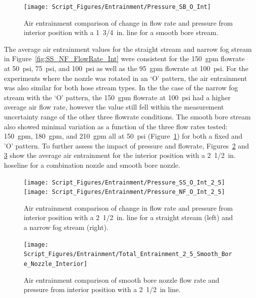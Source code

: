 \documentclass[12pt,oneside]{book}
\begin{document}
\begin{figure}[!ht]
\centering
\texttt{[image: Script\_Figures/Entrainment/Pressure\_SB\_O\_Int]}
\caption[Air Entrainment Comparison of Pressure and Flow Rate for Interior Smooth Bore Nozzle from 1~3/4~in. Line]{Air entrainment comparison of change in flow rate and pressure from interior position with a 1~3/4~in. line for a smooth bore stream.}
\label{fig:SB_Flowrate_Int}
\end{figure}

The average air entrainment values for the straight stream and narrow fog stream in Figure~\ref{fig:SS_NF_FlowRate_Int} were consistent for the 150~gpm flowrate at 50~psi, 75~psi, and 100~psi as well as the 95~gpm flowrate at 100~psi. For the experiments where the nozzle was rotated in an `O' pattern, the air entrainment was also similar for both hose stream types. In the the case of the narrow fog stream with the `O' pattern, the 150~gpm flowrate at 100~psi had a higher average air flow rate, however the value still fell within the measurement uncertainty range of the other three flowrate conditions. The smooth bore stream also showed minimal variation as a function of the three flow rates tested: 150~gpm, 180~gpm, and 210~gpm all at 50~psi (Figure~\ref{fig:SB_Flowrate_Int}) for both a fixed and 'O' pattern. To further assess the impact of pressure and flowrate, Figures~\ref{fig:SS_NF_FlowRate_Int_2_5} and \ref{fig:SB_Flowrate_Int_2_5} show the average air entrainment for the interior position with a 2~1/2~in. hoseline for a combination nozzle and smooth bore nozzle.

\begin{figure}[!ht]
\centering
\texttt{[image: Script\_Figures/Entrainment/Pressure\_SS\_O\_Int\_2\_5]}
\texttt{[image: Script\_Figures/Entrainment/Pressure\_NF\_O\_Int\_2\_5]}
\caption[Air Entrainment Comparison of Pressure and Flow Rate for Interior Combination Nozzle from 2~1/2~in. Line]{Air entrainment comparison of change in flow rate and pressure from interior position with a 2~1/2~in. line for a straight stream (left) and a narrow fog stream (right).}
\label{fig:SS_NF_FlowRate_Int_2_5}
\end{figure}

\begin{figure}[!ht]
\centering
\texttt{[image: Script\_Figures/Entrainment/Total\_Entrainment\_2\_5\_Smooth\_Bore\_Nozzle\_Interior]}
\caption[Air Entrainment Comparison of Exterior Smooth Bore Nozzle from 2~1/2~in. Line]{Air entrainment comparison of smooth bore nozzle flow rate and pressure from interior position with a 2~1/2~in line.}
\label{fig:SB_Flowrate_Int_2_5}
\end{figure}
\end{document}
